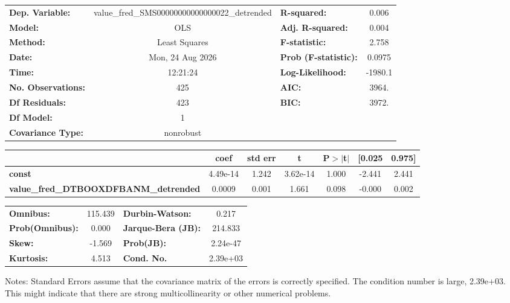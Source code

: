 \begin{center}
\begin{tabular}{lclc}
\toprule
\textbf{Dep. Variable:}                       & value\_fred\_SMS00000000000000022\_detrended & \textbf{  R-squared:         } &     0.006   \\
\textbf{Model:}                               &                     OLS                      & \textbf{  Adj. R-squared:    } &     0.004   \\
\textbf{Method:}                              &                Least Squares                 & \textbf{  F-statistic:       } &     2.758   \\
\textbf{Date:}                                &               Mon, 24 Aug 2026               & \textbf{  Prob (F-statistic):} &   0.0975    \\
\textbf{Time:}                                &                   12:21:24                   & \textbf{  Log-Likelihood:    } &   -1980.1   \\
\textbf{No. Observations:}                    &                       425                    & \textbf{  AIC:               } &     3964.   \\
\textbf{Df Residuals:}                        &                       423                    & \textbf{  BIC:               } &     3972.   \\
\textbf{Df Model:}                            &                         1                    & \textbf{                     } &             \\
\textbf{Covariance Type:}                     &                  nonrobust                   & \textbf{                     } &             \\
\bottomrule
\end{tabular}
\begin{tabular}{lcccccc}
                                              & \textbf{coef} & \textbf{std err} & \textbf{t} & \textbf{P$> |$t$|$} & \textbf{[0.025} & \textbf{0.975]}  \\
\midrule
\textbf{const}                                &     4.49e-14  &        1.242     &  3.62e-14  &         1.000        &       -2.441    &        2.441     \\
\textbf{value\_fred\_DTBOOXDFBANM\_detrended} &       0.0009  &        0.001     &     1.661  &         0.098        &       -0.000    &        0.002     \\
\bottomrule
\end{tabular}
\begin{tabular}{lclc}
\textbf{Omnibus:}       & 115.439 & \textbf{  Durbin-Watson:     } &    0.217  \\
\textbf{Prob(Omnibus):} &   0.000 & \textbf{  Jarque-Bera (JB):  } &  214.833  \\
\textbf{Skew:}          &  -1.569 & \textbf{  Prob(JB):          } & 2.24e-47  \\
\textbf{Kurtosis:}      &   4.513 & \textbf{  Cond. No.          } & 2.39e+03  \\
\bottomrule
\end{tabular}
\end{center}

Notes: \newline
 [1] Standard Errors assume that the covariance matrix of the errors is correctly specified. \newline
 [2] The condition number is large, 2.39e+03. This might indicate that there are \newline
 strong multicollinearity or other numerical problems.